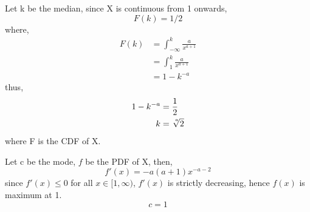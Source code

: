 Let k be the median, since X is continuous from 1 onwards,
\[F(k) = 1/2\]
where,
\begin{align*}
F(k) &= \int_{-\infty}^{k}{\frac{a}{x^{a+1}}} \\
&= \int_{1}^{k}{\frac{a}{x^{a+1}}} \\
&= 1 - k^{-a}
\end{align*}
thus,
\begin{align*}
1-k^{-a} &= \frac{1}{2} \\
k &= \sqrt[\leftroot{-2}\uproot{2}a]{2}
\end{align*}
where F is the CDF of X. 

Let c be the mode, $f$ be the PDF of X, then,
\[f'(x) = -a(a+1)x^{-a-2}\]
since $f'(x) \le 0$ for all $x \in [1,\infty)$, $f'(x)$ is strictly decreasing, hence $f(x)$ is maximum at 1.
\[c=1\]
